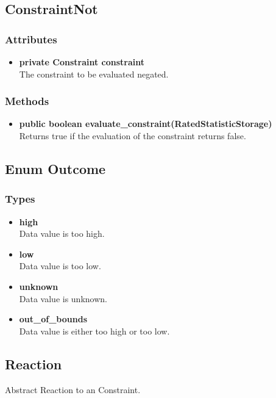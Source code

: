 \subsection{ConstraintNot }

\subsubsection{Attributes}
\begin{itemize}
	\item \textbf{ private Constraint constraint }\\
	The constraint to be evaluated negated.
\end{itemize}
\subsubsection{Methods}
\begin{itemize}
	\item \textbf{ public boolean evaluate\_constraint(RatedStatisticStorage) }\\
	Returns true if the evaluation of the constraint returns false.
\end{itemize}

\subsection{Enum Outcome }

\subsubsection{Types}
\begin{itemize}
	\item \textbf{ high }\\
	Data value is too high.
	\item \textbf{ low }\\
	Data value is too low.
	\item \textbf{ unknown }\\
	Data value is unknown.
	\item \textbf{ out\_of\_bounds }\\
	Data value is either too high or too low.
\end{itemize}


\subsection{Reaction}
	Abstract Reaction to an Constraint.
